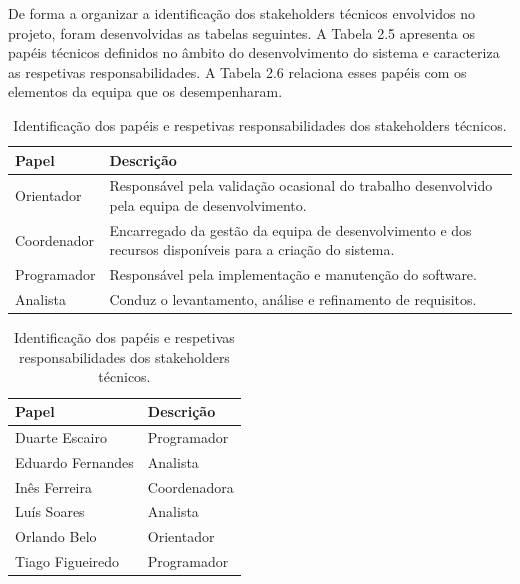 \documentclass[a4paper,12pt]{scrreprt}
\begin{document}
De forma a organizar a identificação dos stakeholders técnicos envolvidos no projeto, foram desenvolvidas as tabelas seguintes. A Tabela 2.5 apresenta os papéis técnicos definidos no âmbito do desenvolvimento do sistema e caracteriza as respetivas responsabilidades. A Tabela 2.6 relaciona esses papéis com os elementos da equipa que os desempenharam.


\begin{table}[H]
	\centering
	\setlength{\arrayrulewidth}{0.6pt}
	\begin{tabular}{|p{5cm}|p{9cm}|}
		\hline
		\rowcolor{gray!20!white}
		\textbf{Papel} & \textbf{Descrição} \\
		\hline
		Orientador & Responsável pela validação ocasional do trabalho desenvolvido pela equipa de desenvolvimento. \\
		\hline
		Coordenador & Encarregado da gestão da equipa de desenvolvimento e dos recursos disponíveis para a criação do sistema. \\
		\hline
		Programador & Responsável pela implementação e manutenção do software. \\
		\hline
		Analista & Conduz o levantamento, análise e refinamento de requisitos.\\
		\hline
	\end{tabular}
	\caption{Identificação dos papéis e respetivas responsabilidades dos stakeholders técnicos.}
\end{table}


\begin{table}[H]
	\centering
	\setlength{\arrayrulewidth}{0.6pt}
	\begin{tabular}{|p{5cm}|p{9cm}|}
		\hline
		\rowcolor{gray!20!white}
		\textbf{Papel} & \textbf{Descrição} \\
		\hline
		Duarte Escairo & Programador \\
		\hline
		Eduardo Fernandes & Analista \\
		\hline
		Inês Ferreira & Coordenadora \\
		\hline
		Luís Soares & Analista \\
		\hline
		Orlando Belo & Orientador \\
		\hline
		Tiago Figueiredo & Programador \\
		\hline
	\end{tabular}
	\caption{Identificação dos papéis e respetivas responsabilidades dos stakeholders técnicos.}
\end{table}
\end{document}
